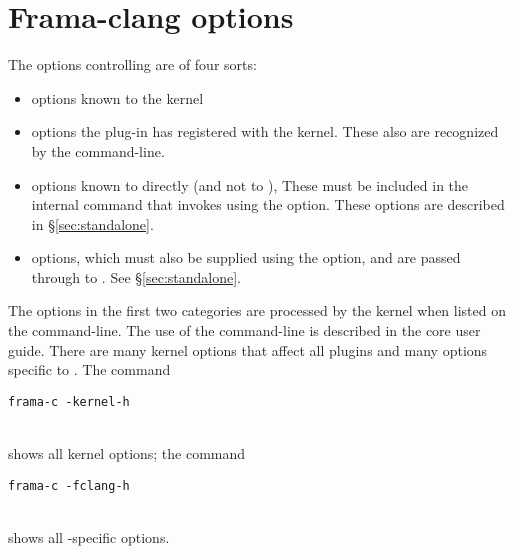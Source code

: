 \section{Frama-clang options}

The options controlling \fclang are of four sorts:
\begin{itemize}
\item options known to the \framac kernel
\item options the  \fclang plug-in has registered with the \framac kernel.
These also are recognized by the \fc command-line.
\item options known to \irg directly (and not to \fc), These must be 
included in the internal command that invokes \irg using the  option. These options are described in \S\ref{sec:standalone}.
\item \clang options, which must also be supplied using the  option, and are passed through \irg to \cl. See \S\ref{sec:standalone}.
\end{itemize}

The options in the first two categories are processed by the \fc kernel when listed on the \fc command-line. 
The use of the \fc command-line is described in the core \fc 
user guide.
There are many kernel options that affect all plugins and many options specific to \fclang.
The command \\
\centerline{\lstinline|frama-c -kernel-h|} \\
shows all kernel options; the command\\
\centerline{\lstinline|frama-c -fclang-h|} \\
shows all \fcl-specific options.

